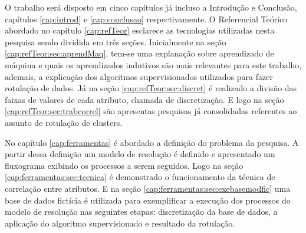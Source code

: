  



O trabalho será disposto em cinco capítulos já incluso a Introdução e Conclusão, capítulos \ref{cap:introd} e \ref{cap:conclusao} respectivamente. O Referencial Teórico abordado no capítulo \ref{cap:refTeor} esclarece as tecnologias utilizadas nesta pesquisa sendo dividida em três seções. Inicialmente na seção \ref{cap:refTeor:sec:aprendMaq}, tem-se uma explanação sobre aprendizado de máquina e quais os aprendizados indutivos são mais relevantes para este trabalho, ademais, a explicação dos algoritmos supervisionados utilizados para fazer rotulação de dados. Já na seção \ref{cap:refTeor:sec:discret} é realizado a divisão das faixas de valores de cada atributo, chamada de discretização. E logo na seção \ref{cap:refTeor:sec:trabcorrel} são apresentas pesquisas já consolidadas referentes ao assunto de rotulação de clusters.

No capítulo \ref{cap:ferramentas} é abordado a definição do problema da pesquisa. A partir dessa definição um modelo de resolução é definido e apresentado um fluxograma exibindo os processos a serem seguidos. Logo na seção \ref{cap:ferramentas:sec:tecnica} é demonstrado o funcionamento da técnica de correlação entre atributos. E na seção \ref{cap:ferramentas:sec:exebasemodfic} uma base de dados fictícia é utilizada para exemplificar a execução dos processos do modelo de resolução nas seguintes etapas: discretização da base de dados, a aplicação do algoritmo supervisionado e resultado da rotulação. 


